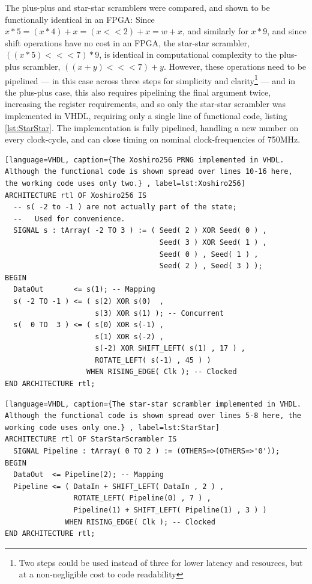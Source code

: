 \documentclass{article}
\begin{document}
The plus-plus and star-star scramblers were compared, and shown to be functionally identical in an FPGA: Since $x*5 = (x*4) + x = (x << 2) + x = w + x$, and similarly for $x*9$, and since shift operations have no cost in an FPGA, the star-star scrambler, $\left( \left( x * 5 \right) <<< 7 \right) * 9$, is identical in computational complexity to the plus-plus scrambler, $\left( \left( x + y \right) <<< 7 \right) + y$. However, these operations need to be pipelined --- in this case across three steps for simplicity and clarity\footnote{Two steps could be used instead of three for lower latency and resources, but at a non-negligible cost to code readability} --- and in the plus-plus case, this also requires pipelining the final argument twice, increasing the register requirements, and so only the star-star scrambler was implemented in VHDL, requiring only a single line of functional code, listing \ref{lst:StarStar}. The implementation is fully pipelined, handling a new number on every clock-cycle, and can close timing on nominal clock-frequencies of 750MHz.

\begin{minipage}{1.0\textwidth}
\centering
\begin{lstlisting}[language=VHDL, caption={The Xoshiro256 PRNG implemented in VHDL. Although the functional code is shown spread over lines 10-16 here, the working code uses only two.} , label=lst:Xoshiro256]
ARCHITECTURE rtl OF Xoshiro256 IS
  -- s( -2 to -1 ) are not actually part of the state;
  --   Used for convenience.
  SIGNAL s : tArray( -2 TO 3 ) := ( Seed( 2 ) XOR Seed( 0 ) , 
                                    Seed( 3 ) XOR Seed( 1 ) , 
                                    Seed( 0 ) , Seed( 1 ) , 
                                    Seed( 2 ) , Seed( 3 ) );
BEGIN
  DataOut       <= s(1); -- Mapping
  s( -2 TO -1 ) <= ( s(2) XOR s(0)  , 
                     s(3) XOR s(1) ); -- Concurrent
  s(  0 TO  3 ) <= ( s(0) XOR s(-1) , 
                     s(1) XOR s(-2) , 
                     s(-2) XOR SHIFT_LEFT( s(1) , 17 ) , 
                     ROTATE_LEFT( s(-1) , 45 ) ) 
                   WHEN RISING_EDGE( Clk ); -- Clocked
END ARCHITECTURE rtl;
\end{lstlisting}
\end{minipage}

\begin{minipage}{1.0\textwidth}
\centering
\begin{lstlisting}[language=VHDL, caption={The star-star scrambler implemented in VHDL. Although the functional code is shown spread over lines 5-8 here, the working code uses only one.} , label=lst:StarStar]
ARCHITECTURE rtl OF StarStarScrambler IS
  SIGNAL Pipeline : tArray( 0 TO 2 ) := (OTHERS=>(OTHERS=>'0'));
BEGIN
  DataOut  <= Pipeline(2); -- Mapping
  Pipeline <= ( DataIn + SHIFT_LEFT( DataIn , 2 ) , 
                ROTATE_LEFT( Pipeline(0) , 7 ) , 
                Pipeline(1) + SHIFT_LEFT( Pipeline(1) , 3 ) ) 
              WHEN RISING_EDGE( Clk ); -- Clocked 
END ARCHITECTURE rtl;
\end{lstlisting}
\end{minipage}
\end{document}
